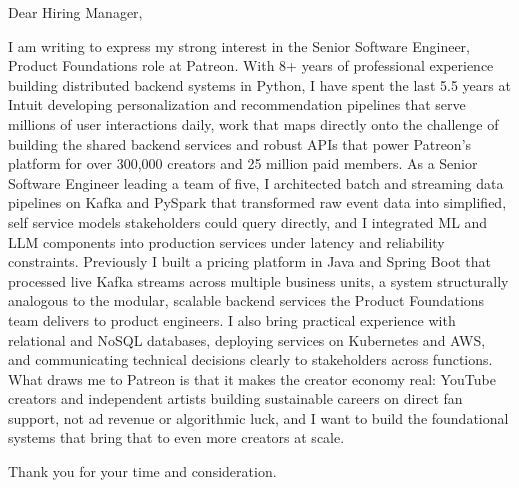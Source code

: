 \documentclass[11pt,a4paper]{letter}
\begin{document}
\begin{letter}{}

	\address{\textbf{Shyam Padia} \\ shyam.padia930@gmail.com \\ (857) 294-9264 \\ linkedin.com/in/shyam-padia}

	\opening{Dear Hiring Manager,}

	I am writing to express my strong interest in the Senior Software Engineer, Product Foundations role at Patreon. With 8+ years of professional experience building distributed backend systems in Python, I have spent the last 5.5 years at Intuit developing personalization and recommendation pipelines that serve millions of user interactions daily, work that maps directly onto the challenge of building the shared backend services and robust APIs that power Patreon's platform for over 300,000 creators and 25 million paid members. As a Senior Software Engineer leading a team of five, I architected batch and streaming data pipelines on Kafka and PySpark that transformed raw event data into simplified, self service models stakeholders could query directly, and I integrated ML and LLM components into production services under latency and reliability constraints. Previously I built a pricing platform in Java and Spring Boot that processed live Kafka streams across multiple business units, a system structurally analogous to the modular, scalable backend services the Product Foundations team delivers to product engineers. I also bring practical experience with relational and NoSQL databases, deploying services on Kubernetes and AWS, and communicating technical decisions clearly to stakeholders across functions. What draws me to Patreon is that it makes the creator economy real: YouTube creators and independent artists building sustainable careers on direct fan support, not ad revenue or algorithmic luck, and I want to build the foundational systems that bring that to even more creators at scale.

	Thank you for your time and consideration.


\end{letter}
\end{document}
